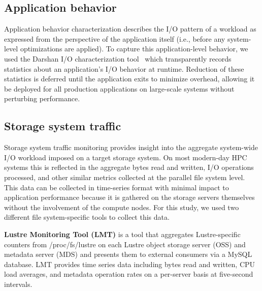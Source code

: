 \subsection{Application behavior} \label{sec:methods/darshan}

Application behavior characterization describes the I/O pattern of a workload as expressed from the perspective of the application itself (i.e., before any system-level optimizations are applied).
To capture this application-level behavior, we used the Darshan I/O characterization tool~\cite{carns200924} which 
transparently records statistics about an application's I/O behavior at runtime.
Reduction of these statistics is deferred until the application exits to minimize overhead, allowing it be deployed for all production applications on large-scale systems without perturbing
performance.

\subsection{Storage system traffic} \label{sec:methods/storagesystraffic}

Storage system traffic monitoring provides insight into the aggregate system-wide I/O workload imposed on a target storage system.
On most modern-day HPC systems this is reflected in the aggregate bytes read and written, I/O operations processed, and other similar metrics collected at the parallel file system level.
This data can be collected in time-series format with minimal impact to application performance because it is gathered on the storage servers themselves without the involvement of the compute nodes.
For this study, we used two different file system-specific tools to collect this data.

\label{sec:methods/lmt}
\textbf{Lustre Monitoring Tool (LMT)} is a tool that aggregates Lustre-specific counters from /proc/fs/lustre on each Lustre object storage server (OSS) and metadata server (MDS) and presents them to external consumers via a MySQL database.
LMT provides time series data including bytes read and written, CPU load averages, and metadata operation rates on a per-server basis at five-second intervals.

